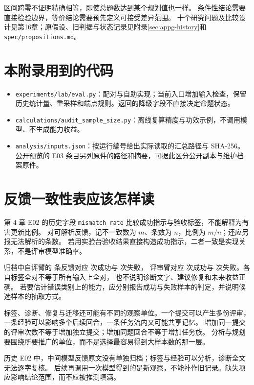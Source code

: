 \begin{sloppypar}
区间跨零不证明精确相等，即使总题数达到某个规划值也一样。
条件性结论需要直接检验边界，等价结论需要预先定义可接受差异范围。
十个研究问题及比较设计见第16章；原假设、旧判据与状态记录见附录\ref{sec:appg-history}和\nolinkurl{spec/propositions.md}。
\end{sloppypar}

\section*{本附录用到的代码}
\begin{sloppypar}
\begin{itemize}
 \item \texttt{experiments/lab/eval.py}：配对与自助实现；当前入口增加输入检查，保留历史统计量、重采样和端点规则。返回的降级字段不直接决定命题状态。
 \item \texttt{calculations/audit\_sample\_size.py}：离线复算精度与功效示例，不调用模型、不生成能力收益。
 \item \nolinkurl{analysis/inputs.json}：按运行编号给出实际读取的汇总路径与 SHA-256。公开预览的 E03 条目另列原件的路径和摘要，可据此区分公开副本与维护档案原件。
\end{itemize}
\end{sloppypar}

\section{反馈一致性表应该怎样读}

第 4 章 E02 的历史字段 \texttt{mismatch\_rate} 比较成功指示与验收标签，不能解释为有害更新比例。
对可解析反馈，记不一致数为 $m$、条数为 $n$，比例为 $m/n$；还应另报无法解析的条数。
若用实验台验收结果直接构造成功指示，二者一致是实现关系，不是评审模型准确率。

归档中自评臂的  条反馈对应  次成功与  次失败，
评审臂对应  次成功与  次失败。各自标签全对不等于所有输入上全对，
也不说明诊断文字、建议修复和未来收益正确。
若要估计错误类别上的能力，应分别报告成功与失败样本的判定，并说明候选样本的抽取方式。

标签、诊断、修复与迁移还可能有不同的观察单位。一个提交可以产生多份评审，
一条经验可以影响多个后续回合，一条任务流内又可能共享记忆。
增加同一提交的评审次数不等于增加独立提交；增加同题回合不等于增加任务族。
分析与规划要围绕所要推广的单位，而不是选择最容易得到大样本数的那一层。

历史 E02 中，中间模型反馈原文没有单独归档；标签与经验可以分析，诊断全文无法逐字复核。
后续再调用一次模型得到的是新观察，不能补作旧记录。缺失项应影响结论范围，而不应被推测填满。

